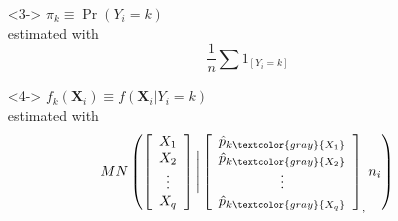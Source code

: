 \documentclass[xcolor={dvipsnames}]{beamer}
\begin{document}
{\begin{columns}
\begin{column}{.45\textwidth}
\begin{itemize}
\begin{align*}
{}& f(Y_i,{\boldsymbol X}_i) \\
 = {}& \sum_{k=1}^K \Pr(Y_i=k) f({\boldsymbol X}_i|Y_i=k) \\
= {}& \sum_{k=1}^K \pi_k f_k({\boldsymbol X}_i) 
\end{align*}


\item[]<3-> $\pi_k \equiv \Pr(Y_i=k)$\\ estimated with 
$$\frac{1}{n}\sum 1_{[Y_i=k]}$$
\item[]
\item[]<4-> $f_k({\boldsymbol X}_i) \equiv f({\boldsymbol X}_i|Y_i=k)$\\ estimated with
$$ MN\left(\left[\begin{array}{c} X_1 \\ X_2 \\ \vdots\\ X_q \end{array} \right] \Bigg|
 \left[\begin{array}{c} \hat p_{k\textcolor{gray}{X_1}} \\ \hat p_{k\textcolor{gray}{X_2}} \\ \vdots\\ \hat p_{k\textcolor{gray}{X_q}} \end{array} \right]_, n_i \right) $$
\item[]
\end{itemize}

\end{column}
\end{columns}

}
\end{document}
